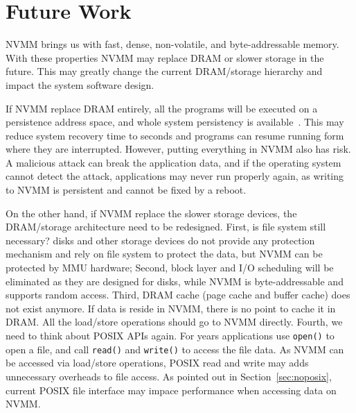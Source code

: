 \section{Future Work} 
\label{sec:future}

NVMM brings us with fast, dense,
non-volatile, and byte-addressable memory. With these properties NVMM may
replace DRAM or slower storage in the future.
This may greatly change the current DRAM/storage
hierarchy and impact the system software design.

If NVMM replace DRAM entirely, all the programs will be executed on a
persistence address space, and whole system persistency is available~\cite{WSP}.
This may reduce system recovery time to seconds and programs can resume
running form where they are interrupted. However, putting everything in
NVMM also has risk. A malicious attack can break the application data, and if
the operating system cannot detect the attack, applications may never run
properly again, as writing to NVMM is persistent and cannot be fixed by a reboot. 

On the other hand, if NVMM replace the slower storage devices, the DRAM/storage
architecture need to be redesigned. First, is file system still necessary?
disks and other storage devices do not provide any
protection mechanism and rely on file system to protect the data, but NVMM
can be protected by MMU hardware; Second, block layer and I/O scheduling
will be eliminated as they are designed for disks,
while NVMM is byte-addressable and supports random access.
Third, DRAM cache (page cache and buffer cache) does not exist anymore. If data
is reside in NVMM, there is no point to cache it in DRAM. All the load/store
operations should go to NVMM directly.
Fourth, we need to think about POSIX APIs again. For years applications use
\texttt{open()} to open a file, and call \texttt{read()} and \texttt{write()} to
access the file data. As NVMM can be accessed via load/store operations, 
POSIX read and write may adds unnecessary overheads to file access.
 As pointed out in Section~\ref{sec:noposix}, current POSIX file 
interface may impace performance when accessing data on NVMM.

